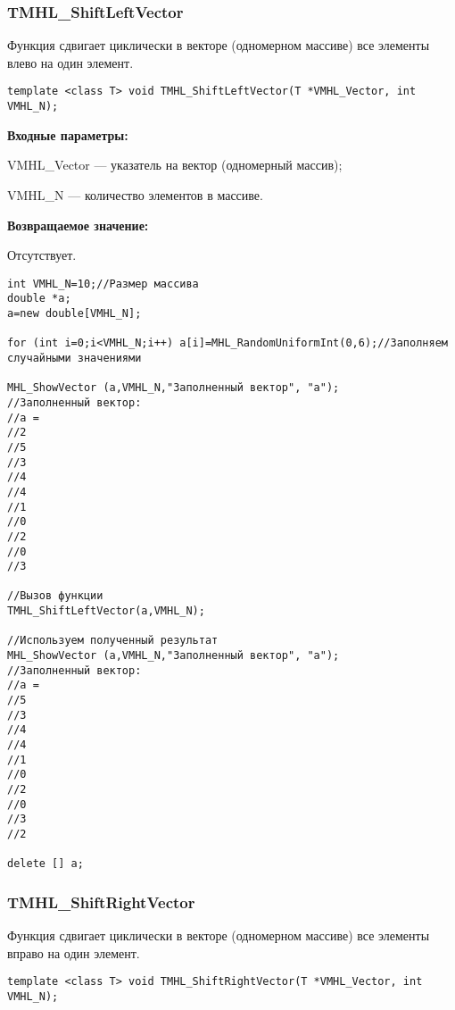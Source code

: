 \documentclass[a4paper,12pt]{article}
\begin{document}
\subsubsection{TMHL\_ShiftLeftVector}\label{TMHL_ShiftLeftVector}

Функция сдвигает циклически в векторе (одномерном массиве) все элементы влево на один элемент.


\begin{lstlisting}[label=code_syntax_TMHL_ShiftLeftVector,caption=Синтаксис]
template <class T> void TMHL_ShiftLeftVector(T *VMHL_Vector, int VMHL_N);
\end{lstlisting}

\textbf{Входные параметры:}

 VMHL\_Vector --- указатель на вектор (одномерный массив);
 
 VMHL\_N --- количество элементов в массиве.

\textbf{Возвращаемое значение:}

Отсутствует.


\begin{lstlisting}[label=code_use_TMHL_ShiftLeftVector,caption=Пример использования]
int VMHL_N=10;//Размер массива
double *a;
a=new double[VMHL_N];

for (int i=0;i<VMHL_N;i++) a[i]=MHL_RandomUniformInt(0,6);//Заполняем случайными значениями

MHL_ShowVector (a,VMHL_N,"Заполненный вектор", "a");
//Заполненный вектор:
//a =	
//2
//5
//3
//4
//4
//1
//0
//2
//0
//3

//Вызов функции
TMHL_ShiftLeftVector(a,VMHL_N);

//Используем полученный результат
MHL_ShowVector (a,VMHL_N,"Заполненный вектор", "a");
//Заполненный вектор:
//a =	
//5
//3
//4
//4
//1
//0
//2
//0
//3
//2

delete [] a;
\end{lstlisting}

\subsubsection{TMHL\_ShiftRightVector}\label{TMHL_ShiftRightVector}

Функция сдвигает циклически в векторе (одномерном массиве) все элементы вправо на один элемент.


\begin{lstlisting}[label=code_syntax_TMHL_ShiftRightVector,caption=Синтаксис]
template <class T> void TMHL_ShiftRightVector(T *VMHL_Vector, int VMHL_N);
\end{lstlisting}
\end{document}
